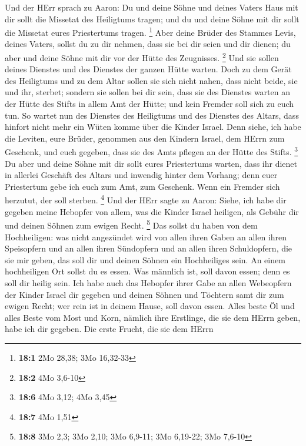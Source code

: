  Und der HErr sprach zu Aaron: Du und deine Söhne und
deines Vaters Haus mit dir sollt die Missetat des Heiligtums tragen; und
du und deine Söhne mit dir sollt die Missetat eures Priestertums tragen.
\footnote{\textbf{18:1} 2Mo 28,38; 3Mo 16,32-33}  Aber
deine Brüder des Stammes Levis, deines Vaters, sollst du zu dir nehmen,
dass sie bei dir seien und dir dienen; du aber und deine Söhne mit dir
vor der Hütte des Zeugnisses. \footnote{\textbf{18:2} 4Mo 3,6-10}
 Und sie sollen deines Dienstes und des Dienstes der
ganzen Hütte warten. Doch zu dem Gerät des Heiligtums und zu dem Altar
sollen sie sich nicht nahen, dass nicht beide, sie und ihr, sterbet;
 sondern sie sollen bei dir sein, dass sie des Dienstes
warten an der Hütte des Stifts in allem Amt der Hütte; und kein Fremder
soll sich zu euch tun.  So wartet nun des Dienstes des
Heiligtums und des Dienstes des Altars, dass hinfort nicht mehr ein
Wüten komme über die Kinder Israel.  Denn siehe, ich habe
die Leviten, eure Brüder, genommen aus den Kindern Israel, dem HErrn zum
Geschenk, und euch gegeben, dass sie des Amts pflegen an der Hütte des
Stifts. \footnote{\textbf{18:6} 4Mo 3,12; 4Mo 3,45}  Du
aber und deine Söhne mit dir sollt eures Priestertums warten, dass ihr
dienet in allerlei Geschäft des Altars und inwendig hinter dem Vorhang;
denn euer Priestertum gebe ich euch zum Amt, zum Geschenk. Wenn ein
Fremder sich herzutut, der soll sterben. \footnote{\textbf{18:7} 4Mo
  1,51}  Und der HErr sagte zu Aaron: Siehe, ich habe dir
gegeben meine Hebopfer von allem, was die Kinder Israel heiligen, als
Gebühr dir und deinen Söhnen zum ewigen Recht. \footnote{\textbf{18:8}
  3Mo 2,3; 3Mo 2,10; 3Mo 6,9-11; 3Mo 6,19-22; 3Mo 7,6-10} 
Das sollst du haben von dem Hochheiligen: was nicht angezündet wird von
allen ihren Gaben an allen ihren Speisopfern und an allen ihren
Sündopfern und an allen ihren Schuldopfern, die sie mir geben, das soll
dir und deinen Söhnen ein Hochheiliges sein.  An einem
hochheiligen Ort sollst du es essen. Was männlich ist, soll davon essen;
denn es soll dir heilig sein.  Ich habe auch das Hebopfer
ihrer Gabe an allen Webeopfern der Kinder Israel dir gegeben und deinen
Söhnen und Töchtern samt dir zum ewigen Recht; wer rein ist in deinem
Hause, soll davon essen.  Alles beste Öl und alles Beste
vom Most und Korn, nämlich ihre Erstlinge, die sie dem HErrn geben, habe
ich dir gegeben.  Die erste Frucht, die sie dem HErrn
